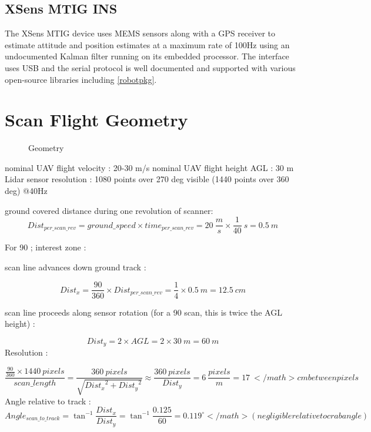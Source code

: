 \documentclass[a4paper,11pt]{report}
\begin{document}
\subsection{XSens MTIG INS}
\label{MTIG}

The XSens MTIG device uses MEMS sensors along with a GPS receiver to estimate attitude and position estimates at a maximum rate of 100Hz using an undocumented Kalman filter running on its embedded processor. The interface uses USB and the serial protocol is well documented and supported with various open-source libraries including \ref{robotpkg}.

\section{Scan Flight Geometry}
\label{geometry}

\begin{figure}[h]
  \centering
  \caption{Geometry}
  \label{fig:geometry}
\end{figure}


nominal UAV flight velocity : 20-30 m/s
nominal UAV flight height AGL : 30 m
Lidar sensor resolution : 1080 points over 270 deg visible (1440 points over 360 deg) @40Hz

ground covered distance during one revolution of scanner:
\begin{equation}
Dist_{per\_scan\_rev} = ground\_speed \times time_{per\_scan\_rev} = 20~\frac{m}{s} \times \frac{1}{40}~s = 0.5~m 
\end{equation}


For 90 \degree; interest zone :

scan line advances down ground track :

\begin{equation} 
Dist_{x}=  \frac{90}{360} \times Dist_{per\_scan\_rev} = \frac{1}{4} \times 0.5~m = 12.5~cm
\end{equation}

scan line proceeds along sensor rotation (for a 90 scan, this is twice the AGL height) :

\begin{equation} 
Dist_{y}=  2 \times AGL = 2 \times 30~m = 60~m
\end{equation}
Resolution :

\begin{equation}  
\frac{ \frac{90}{360} \times 1440~pixels }{scan\_length} = \frac{360~pixels}{\sqrt{{Dist_x}^2+{Dist_y}^2}} \approx \frac{360~pixels}{Dist_y}= 6~ \frac{pixels}{m} = 17~</math>cm between pixels
\end{equation}
Angle relative to track :
\begin{equation} Angle_{scan\_to\_track} = \tan^{-1} \frac{Dist_x}{Dist_y} = \tan^{-1} \frac{0.125}{60} = 0.119^\circ</math> (negligible relative to crab angle)
\end{equation}
\end{document}
